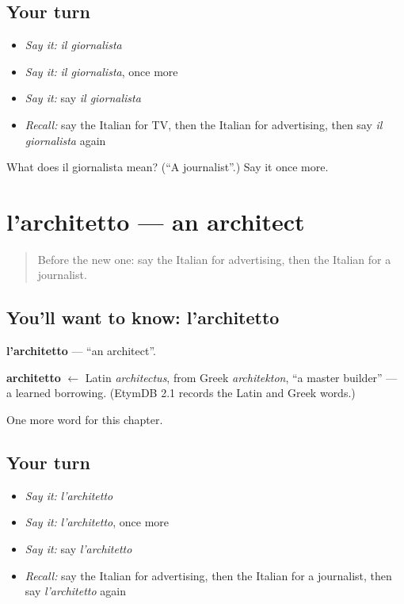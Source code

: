 \subsection*{Your turn}
\begin{itemize}
\raggedright
  \item \emph{Say it:} \emph{il giornalista}
  \item \emph{Say it:} \emph{il giornalista}, once more
  \item \emph{Say it:} say \emph{il giornalista}
  \item \emph{Recall:} say the Italian for TV, then the Italian for advertising, then say \emph{il giornalista} again
\end{itemize}

\begin{tcolorbox}[breakable,colback=teal!4,colframe=teal!35!black,title={Before you move on}]
What does il giornalista mean? (\textquotedblleft{}A journalist\textquotedblright{}.) Say it once more.
\end{tcolorbox}
\section[l'architetto]{l'architetto — an architect}

\label{lesson:IT-C250-architetto}



\begin{quote}
Before the new one: say the Italian for advertising, then the Italian for a journalist.
\end{quote}

\subsection*{You'll want to know: l'architetto}
\textbf{l'architetto} — \textquotedblleft{}an architect\textquotedblright{}.

\begin{cousinweb}
\textbf{architetto} $\leftarrow$ Latin \emph{architectus}, from Greek \emph{architekton}, \textquotedblleft{}a master builder\textquotedblright{} — a learned borrowing. (EtymDB 2.1 records the Latin and Greek words.)
\end{cousinweb}

\begin{grammarlens}[title={What you've built}]
One more word for this chapter.
\end{grammarlens}

\subsection*{Your turn}
\begin{itemize}
\raggedright
  \item \emph{Say it:} \emph{l'architetto}
  \item \emph{Say it:} \emph{l'architetto}, once more
  \item \emph{Say it:} say \emph{l'architetto}
  \item \emph{Recall:} say the Italian for advertising, then the Italian for a journalist, then say \emph{l'architetto} again
\end{itemize}


